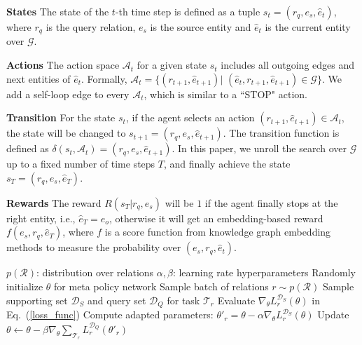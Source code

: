 \documentclass[11pt,a4paper]{article}
\begin{document}
\textbf{States} \quad The state of the $t$-th time step is defined as a tuple $s_t = (r_q, e_s, \hat{e}_t)$, where $r_q$ is the query relation, $e_s$ is the source entity and $\hat{e}_t$ is the current entity over $\mathcal{G}$. 

\textbf{Actions} \quad The action space $\mathcal{A}_t$ for a given state $s_t$ includes all outgoing edges and next entities of $\hat{e}_t$. Formally, $\mathcal{A}_t = \{(r_{t+1}, \hat{e}_{t+1})|$ $ (\hat{e}_t, r_{t+1}, \hat{e}_{t+1}) \in \mathcal{G}\}$. We add a self-loop edge to every $\mathcal{A}_t$, which is similar to a ``STOP" action.

\textbf{Transition} \quad For the state $s_t$, if the agent selects an action $(r_{t+1}, \hat{e}_{t+1}) \in \mathcal{A}_t$, the state will be changed to $s_{t+1} = (r_q, e_s, \hat{e}_{t+1})$. The transition function is defined as $\delta(s_t, \mathcal{A}_t) = (r_q, e_s, \hat{e}_{t+1})$. 
In this paper, we unroll the search over $\mathcal{G}$ up to a fixed number of time steps $T$, and finally achieve the state $s_{T} = (r_q, e_s, \hat{e}_{T})$. 

\textbf{Rewards} \quad The reward $R(s_{T}|r_q, e_s)$ will be $1$ if the agent finally stops at the right entity, i.e., $\hat{e}_{T} = e_o$, otherwise it will get an embedding-based reward $f(e_s, r_q, \hat{e}_T)$, where $f$ is a score function from knowledge graph embedding methods to measure the probability over $(e_s, r_q, \hat{e}_t)$.

\begin{algorithm}[t] 
\small
\caption{Meta-Learning for multi-hop reasoning over knowledge graphs} 
\label{algorithm-kgr}
\begin{algorithmic}[1] 
\Require 
$p(\mathcal{R})$: distribution over relations
\Require 
$\alpha, \beta$: learning rate hyperparameters
\State Randomly initialize $\theta$ for meta policy network
\State Sample batch of relations $r \sim p(\mathcal{R})$
\State Sample supporting set $\mathcal{D}_S$ and query set $\mathcal{D}_Q$ for task $\mathcal{T}_r$
\State Evaluate $\nabla_{\theta}L_r^{\mathcal{D}_S}(\theta)$ in Eq.~(\ref{loss_func})
\State Compute adapted parameters: $\theta'_r = \theta - \alpha \nabla_{\theta}L_r^{\mathcal{D}_S}(\theta)$
\EndFor
\State Update $\theta \leftarrow \theta - \beta \nabla_{\theta}\sum_{\mathcal{T}_r} L_r^{\mathcal{D}_Q} (\theta'_r)$
\EndWhile
\end{algorithmic} 
\end{algorithm}
\end{document}
